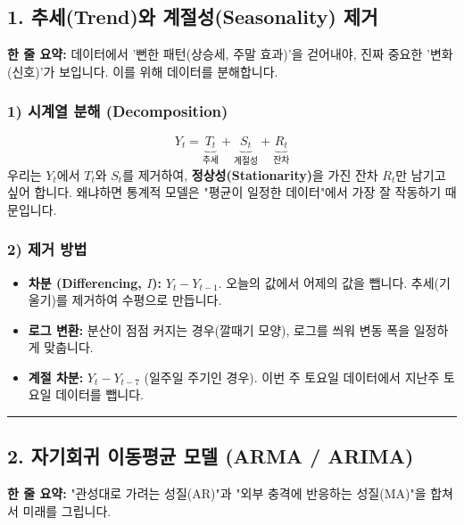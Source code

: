 \documentclass[11pt,a4paper]{book}
\theoremstyle{definition}
\begin{document}
\subsection{1. 추세(Trend)와 계절성(Seasonality) 제거}


\begin{conceptbox}[title={개념 1: 양파 껍질 벗기기}]
\textbf{한 줄 요약:} 데이터에서 '뻔한 패턴(상승세, 주말 효과)'을 걷어내야, 진짜 중요한 '변화(신호)'가 보입니다. 이를 위해 데이터를 분해합니다.
\end{conceptbox}

\subsubsection*{1) 시계열 분해 (Decomposition)}
$$ Y_t = \underbrace{T_t}_{\text{추세}} + \underbrace{S_t}_{\text{계절성}} + \underbrace{R_t}_{\text{잔차}} $$
우리는 $Y_t$에서 $T_t$와 $S_t$를 제거하여, \textbf{정상성(Stationarity)}을 가진 잔차 $R_t$만 남기고 싶어 합니다. 왜냐하면 통계적 모델은 "평균이 일정한 데이터"에서 가장 잘 작동하기 때문입니다.

\subsubsection*{2) 제거 방법}
\begin{itemize}
    \item \textbf{차분 (Differencing, $I$):} $Y_t - Y_{t-1}$. 오늘의 값에서 어제의 값을 뺍니다. 추세(기울기)를 제거하여 수평으로 만듭니다.
    \item \textbf{로그 변환:} 분산이 점점 커지는 경우(깔때기 모양), 로그를 씌워 변동 폭을 일정하게 맞춥니다.
    \item \textbf{계절 차분:} $Y_t - Y_{t-7}$ (일주일 주기인 경우). 이번 주 토요일 데이터에서 지난주 토요일 데이터를 뺍니다.
\end{itemize}

\vspace{0.5cm}\hrule\vspace{0.5cm}

\subsection{2. 자기회귀 이동평균 모델 (ARMA / ARIMA)}


\begin{conceptbox}[title={개념 2: 관성(Inertia)과 충격(Shock)}]
\textbf{한 줄 요약:} "관성대로 가려는 성질(AR)"과 "외부 충격에 반응하는 성질(MA)"을 합쳐서 미래를 그립니다.
\end{conceptbox}
\end{document}
